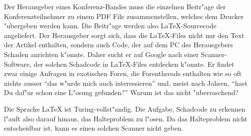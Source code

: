 Der Herausgeber eines Konferenz-Bandes muss die einzelnen Beitr"age der 
Konferenzteilnehmer zu einem PDF File zusammenstellen, welches dem Drucker
"ubergeben werden kann.
Die Beitr"age werden also \LaTeX-Sourcecode angeliefert.
Der Herausgeber sorgt sich, dass die \LaTeX-Files nicht nur den Text
der Artikel enthalten, sondern auch Code, der auf dem PC des Herausgebers
Schaden anrichten k"onnte.
Daher sucht er auf Google nach einer Scanner-Software, der solchen Schadcode  in
\LaTeX-Files entdecken k"onnte.
Er findet zwar einige Anfragen in exotischen Foren, die Forenthreads
enthalten wie so oft nichts ausser ``das w"urde mich auch interessieren'' und,
meist nach Jahren, ``hast Du daf"ur schon eine L"osung gefunden?''
Warum ist das nicht "uberraschend?

\begin{loesung}
Die Sprache \LaTeX{} ist Turing-vollst"andig.
Die Aufgabe, Schadcode zu erkennen l"auft also darauf hinaus, das Halteproblem
zu l"osen.
Da das Halteproblem nicht entscheidbar ist, kann es einen solchen Scanner
nicht geben.
\end{loesung}

